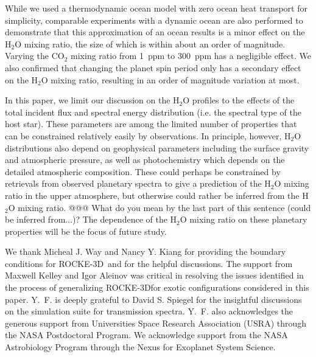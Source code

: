 \documentclass[11pt,numberedappendix,twocolappendix,]{emulateapj}
\def\water{H$_2$O }
\def\modelE{ROCKE-3D}
\newcommand{\dsa}[1]{{\color{blue}#1}}
\begin{document}
While we used a thermodynamic ocean model with zero ocean heat transport for simplicity, comparable experiments with a dynamic ocean are also performed to demonstrate that this approximation of \dsa{an} ocean results is a minor effect on the \water mixing ratio, \dsa{the size of which is within} about an order of magnitude. 
Varying \dsa{the} CO$_2$ \dsa{mixing ratio} from 1~ppm to 300~ppm \dsa{has a} negligible effect. 
We also confirmed that \dsa{changing the planet spin period only has a secondary effect} on the \water mixing ratio, resulting in an order of magnitude variation at most. 


In this paper, we limit our discussion on the \water profiles to the effects of the total incident flux and spectral energy distribution (i.e. the spectral \dsa{type} of the host star). 
These parameters are among the limited number of properties that can be constrained relatively easily \dsa{by observations}. 
In principle, however, \water distributions also depend on geophysical parameters including the surface gravity and atmospheric pressure, as well as photochemistry \dsa{which} depends on \dsa{the} detailed atmospheric composition. 
These could perhaps be constrained by retrievals from observed planetary spectra to give a prediction \dsa{of the} \water mixing ratio in the upper atmosphere, but otherwise could rather be inferred from the \water mixing ratio. \dsa{@@@ What do you mean by the last part of this sentence (could be inferred from...)?}
The dependence \dsa{of the \water mixing ratio} on these planetary properties will be \dsa{the} focus of future study. 





\acknowledgments
We thank Micheal J. Way and Nancy Y. Kiang for providing the boundary conditions for \modelE \ and for the helpful discussions. 
The support from Maxwell Kelley and Igor Aleinov was critical in resolving the issues identified in the process of generalizing \modelE for exotic configurations considered in this paper. 
Y.~F. is deeply grateful to David S. Spiegel for the insightful discussions on the simulation suite for transmission spectra. 
Y.~F. also acknowledges the generous support from Universities Space Research Association (USRA) through the NASA Postdoctoral Program. 
\dsa{We acknowledge support from the NASA Astrobiology Program through the Nexus for Exoplanet System Science.}




\appendix
\end{document}
